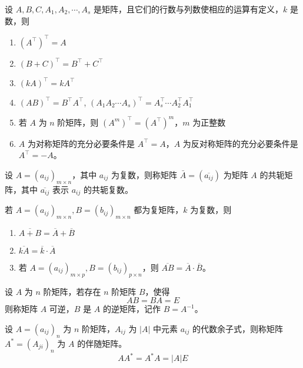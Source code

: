 \documentclass{ctexbook}
\begin{document}
\begin{proposition}[矩阵转置的性质]
    设 $A,B,C,A_1,A_2,\cdots,A_s$ 是矩阵，且它们的行数与列数使相应的运算有定义，$k$ 是数，则
    \begin{enumerate}
        \item $(A^\top)^\top=A$
        \item $(B+C)^\top=B^\top+C^\top$
        \item $(kA)^\top=kA^\top$
        \item $(AB)^\top=B^\top A^\top$, $(A_1A_2\cdots A_s)^\top=A_s^\top\cdots A_2^\top A_1^\top$
        \item 若 $A$ 为 $n$ 阶矩阵，则 $(A^m)^\top=(A^\top)^m$，$m$ 为正整数
        \item $A$ 为对称矩阵的充分必要条件是 $A^\top=A$，$A$ 为反对称矩阵的充分必要条件是 $A^\top=-A$。
    \end{enumerate}
\end{proposition}

\begin{definition}[矩阵共轭]
    设 $A=(a_{ij})_{m\times n}$，其中 $a_{ij}$ 为复数，则称矩阵 $\bar{A}=(\overline{a_{ij}})$ 为矩阵 $A$ 的共轭矩阵，其中 $\overline{a_{ij}}$ 表示 $a_{ij}$ 的共轭复数。
\end{definition}

\begin{proposition}[矩阵共轭的性质]
    若 $A=(a_{ij})_{m\times n}, B=(b_{ij})_{m\times n}$ 都为复矩阵，$k$ 为复数，则
    \begin{enumerate}
        \item $\overline{A+B}=\overline{A}+\overline{B}$
        \item $\overline{kA}=\overline{k}\cdot\overline{A}$
        \item 若 $A=(a_{ij})_{m\times p},B=(b_{ij})_{p\times n}$，则 $\overline{AB}=\overline{A}\cdot\overline{B}$。
    \end{enumerate}
\end{proposition}

\begin{definition}[逆矩阵]
    设 $A$ 为 $n$ 阶矩阵，若存在 $n$ 阶矩阵 $B$，使得
    \begin{equation}
        AB=BA=E
    \end{equation}
    则称矩阵 $A$ 可逆，$B$ 是 $A$ 的逆矩阵，记作 $B=A^{-1}$。
\end{definition}

\begin{definition}[伴随矩阵]
    设 $A=(a_{ij})_{n}$ 为 $n$ 阶矩阵，$A_{ij}$ 为 $|A|$ 中元素 $a_{ij}$ 的代数余子式，则称矩阵 $A^*=(A_{ji})_{n}$ 为 $A$ 的伴随矩阵。
    \begin{equation}
        AA^*=A^*A=|A|E
    \end{equation}
\end{definition}
\end{document}
